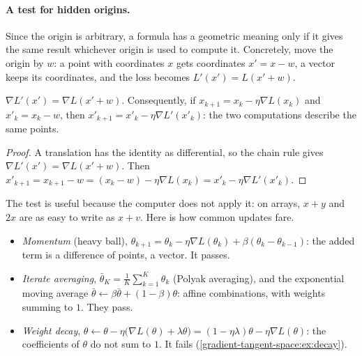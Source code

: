 \begin{notechapter}
\paragraph{A test for hidden origins.} Since the origin is arbitrary, a formula has a geometric
meaning only if it gives the same result whichever origin is used to compute it. Concretely, move
the origin by $w$: a point with coordinates $x$ gets coordinates $x' = x - w$, a vector keeps its
coordinates, and the loss becomes $L'(x') = L(x' + w)$.

\begin{proposition}\label{gradient-tangent-space:prop:origin}
$\nabla L'(x') = \nabla L(x' + w)$. Consequently, if $x_{k+1} = x_k - \eta\nabla L(x_k)$ and $x'_k = x_k - w$, then
$x'_{k+1} = x'_k - \eta\nabla L'(x'_k)$: the two computations describe the same points.
\end{proposition}

\begin{proof}
A translation has the identity as differential, so the chain rule gives $\nabla L'(x') = \nabla L(x' + w)$.
Then $x'_{k+1} = x_{k+1} - w = (x_k - w) - \eta\nabla L(x_k) = x'_k - \eta\nabla L'(x'_k)$.
\end{proof}

The test is useful because the computer does not apply it: on arrays, $x + y$ and $2x$ are as
easy to write as $x + v$. Here is how common updates fare.
\begin{itemize}[nosep]
  \item \emph{Momentum} (heavy ball), $\theta_{k+1} = \theta_k - \eta\nabla L(\theta_k) + \beta(\theta_k - \theta_{k-1})$: the added term is a
        difference of points, a vector. It passes.
  \item \emph{Iterate averaging}, $\bar\theta_K = \frac1K\sum_{k=1}^K\theta_k$ (Polyak averaging), and the exponential moving
        average $\bar\theta\leftarrow\beta\bar\theta + (1 - \beta)\theta$: affine combinations, with weights summing to $1$. They pass.
  \item \emph{Weight decay}, $\theta\leftarrow\theta - \eta\bigl(\nabla L(\theta) + \lambda\theta\bigr) = (1 - \eta\lambda)\theta - \eta\nabla L(\theta)$: the
        coefficients of $\theta$ do not sum to $1$. It fails (\cref{gradient-tangent-space:ex:decay}).
\end{itemize}


\end{notechapter}
